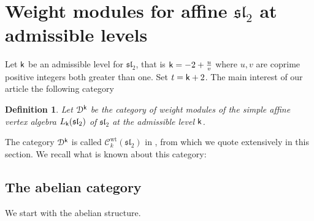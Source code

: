 \documentclass[a4paper, reqno]{amsart}
\newtheorem{definition}[theorem]{Definition}
\theoremstyle{introTheorems}
\newcommand\cC{\mathcal{C}}
\newcommand\cD{\mathcal{D}}
\renewcommand\sl{\mathfrak{sl}}
\renewcommand{\1}{\mathbbold{1}}
\begin{document}
\section{Weight modules for affine \texorpdfstring{$\sl_2$}{sl(2)} at admissible levels}\label{subsec:affine-sl2-wt-mods}



Let $\mathsf{k}$ be an admissible level for $\sl_2$, that is $\mathsf{k} = -2 + \frac{u}{v}$
where $u, v$ are coprime positive integers both greater than one. Set $t = \mathsf{k}+2$. The main interest of our article the following category
\begin{definition}
Let $\cD^\k$ be the category of  weight modules of the simple affine vertex algebra $L_\k(\sl_2)$ of $\sl_2$ at the admissible level $\mathsf{k}$.
\end{definition}

The category $\cD^\k$ is called $\cC_k^{\mathrm{wt}}(\sl_2)$ in \cite{ACK}, from which we quote extensively in this section. 
We recall what is known about this category:

\subsection{The abelian category}\label{subsec:sl2abelian}

We start with the abelian structure.
\end{document}
